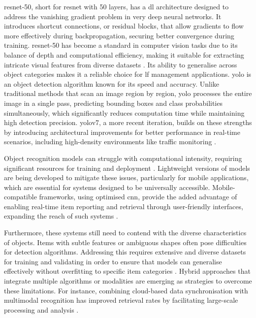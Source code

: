 \ac{resnet}-50, short for \acl{resnet} with 50 layers, has a \ac{dl} architecture designed to address the vanishing gradient problem in very deep neural networks. It introduces shortcut connections, or residual blocks, that allow gradients to flow more effectively during backpropagation, securing better convergence during training. \ac{resnet}-50 has become a standard in computer vision tasks due to its balance of depth and computational efficiency, making it suitable for extracting intricate visual features from diverse datasets \cite{He2015}. Its ability to generalise across object categories makes it a reliable choice for \ac{lf} management applications. \ac{yolo} is an object detection algorithm known for its speed and accuracy. Unlike traditional methods that scan an image region by region, \ac{yolo} processes the entire image in a single pass, predicting bounding boxes and class probabilities simultaneously, which significantly reduces computation time while maintaining high detection precision. \ac{yolo}v7, a more recent iteration, builds on these strengths by introducing architectural improvements for better performance in real-time scenarios, including high-density environments like traffic monitoring \cites{Redmon2015, Wang2022}.

Object recognition models can struggle with computational intensity, requiring significant resources for training and deployment \cites{Lubna2021, Mezhenin2021}. Lightweight versions of models are being developed to mitigate these issues, particularly for mobile applications, which are essential for systems designed to be universally accessible. Mobile-compatible frameworks, using optimised \ac{cnn}, provide the added advantage of enabling real-time item reporting and retrieval through user-friendly interfaces, expanding the reach of such systems \cites{Stout2024, Ghazal2016}.

Furthermore, these systems still need to contend with the diverse characteristics of objects. Items with subtle features or ambiguous shapes often pose difficulties for detection algorithms. Addressing this requires extensive and diverse datasets for training and validating in order to ensure that models can generalise effectively without overfitting to specific item categories \cites{Prawira2024, Liu2022, Sharma2024}. Hybrid approaches that integrate multiple algorithms or modalities are emerging as strategies to overcome these limitations. For instance, combining cloud-based data synchronisation with multimodal recognition has improved retrieval rates by facilitating large-scale processing and analysis \cite{Liu2024, Vedanth2024}.

